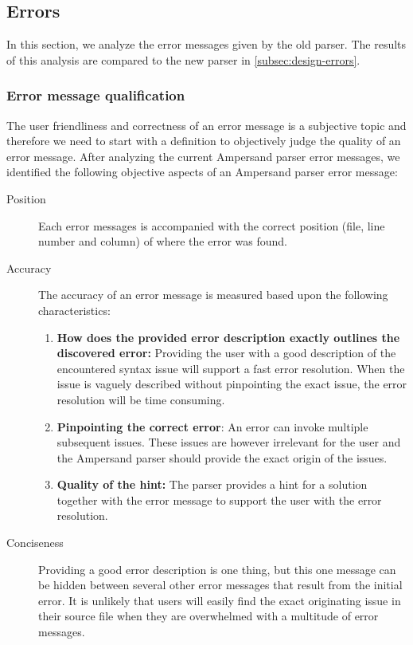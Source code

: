 
\subsection{Errors}
\label{subsec:analysis-errors}
In this section, we analyze the error messages given by the old parser.
The results of this analysis are compared to the new parser in \autoref{subsec:design-errors}.

\subsubsection{Error message qualification}
The user friendliness and correctness of an error message is a subjective topic and therefore we need to start with a definition to objectively judge the quality of an error message.
After analyzing the current Ampersand parser error messages, we identified the following objective aspects of an Ampersand parser error message:
%
\begin{description}
	\item [Position]
	Each error messages is accompanied with the correct position (file, line number and column) of where the error was found.
	\item [Accuracy]
	The accuracy of an error message is measured based upon the following characteristics:
	\begin{enumerate}
		\item	\textbf{\small How does the provided error description exactly outlines the discovered error:}
				Providing the user with a good description of the encountered syntax issue will support a fast error resolution.
				When the issue is vaguely described without pinpointing the exact issue, the error resolution will be time consuming.
		\item	\textbf{\small Pinpointing the correct error}:
				An error can invoke multiple subsequent issues. 
				These issues are however irrelevant for the user and the Ampersand parser should provide the exact origin of the issues.
		\item	\textbf{\small Quality of the hint:}
			The parser provides a hint for a solution together with the error message to support the user with the error resolution.
	\end {enumerate}
    \item[Conciseness]
	Providing a good error description is one thing, but this one message can be hidden between several other error messages that result from the initial error.
	It is unlikely that users will easily find the exact originating issue in their source file when they are overwhelmed with a multitude of error messages. %
\end {description}
